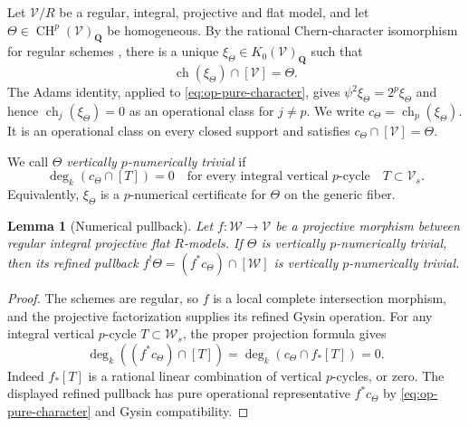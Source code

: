 \documentclass[11pt]{article}
\newtheorem{lemma}[theorem]{Lemma}
\theoremstyle{definition}
\theoremstyle{remark}
\numberwithin{equation}{section}
\newcommand{\CH}{\operatorname{CH}}
\begin{document}
Let $\mathcal V/R$ be a regular, integral, projective and flat model,
and let $\Theta\in\CH^p(\mathcal V)_{\mathbf Q}$ be homogeneous.
By the rational Chern-character isomorphism for regular schemes
\cite[Tag~0FEY]{StacksFEY}, there is a unique
$\xi_\Theta\in K_0(\mathcal V)_{\mathbf Q}$ such that
\begin{equation}\label{eq:op-pure-character}
       \operatorname{ch}(\xi_\Theta)\cap[\mathcal V]=\Theta.
\end{equation}
The Adams identity, applied to \eqref{eq:op-pure-character}, gives
$\psi^2\xi_\Theta=2^p\xi_\Theta$ and hence
$\operatorname{ch}_j(\xi_\Theta)=0$ as an operational class
for $j\ne p$.  We write
$c_\Theta=\operatorname{ch}_p(\xi_\Theta)$.  It is an
operational class on every closed support and satisfies
$c_\Theta\cap[\mathcal V]=\Theta$.

We call $\Theta$ \emph{vertically $p$-numerically trivial} if
\begin{equation}\label{eq:vertical-numerical-def}
 \deg_k(c_\Theta\cap[T])=0
 \quad\text{for every integral vertical $p$-cycle}
 \quad T\subset\mathcal V_s.
\end{equation}
Equivalently, $\xi_\Theta$ is a $p$-numerical certificate for
$\Theta$ on the generic fiber.

\begin{lemma}[Numerical pullback]\label{lem:operational-pullback}
Let $f:\mathcal W\to\mathcal V$ be a projective morphism between
regular integral projective flat $R$-models.  If $\Theta$ is
vertically $p$-numerically trivial, then its refined pullback
$f^!\Theta=(f^*c_\Theta)\cap[\mathcal W]$ is vertically
$p$-numerically trivial.
\end{lemma}

\begin{proof}
The schemes are regular, so $f$ is a local complete intersection
morphism, and the projective factorization supplies its refined
Gysin operation.  For any integral vertical $p$-cycle
$T\subset\mathcal W_s$, the proper projection formula gives
\[
 \deg_k((f^*c_\Theta)\cap[T])
       =\deg_k(c_\Theta\cap f_*[T])=0.
\]
Indeed $f_*[T]$ is a rational linear combination of vertical
$p$-cycles, or zero.  The displayed refined pullback has pure
operational representative $f^*c_\Theta$ by
\eqref{eq:op-pure-character} and Gysin compatibility.
\end{proof}
\end{document}
